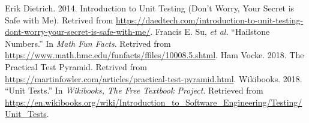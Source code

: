 \documentclass{utap}
\begin{document}
    \begin{thebibliography}{9}
    \begin{latinitems}
     Erik Dietrich. 2014. Introduction to Unit Testing (Don’t Worry, Your Secret is Safe with Me). Retrived from \url{https://daedtech.com/introduction-to-unit-testing-dont-worry-your-secret-is-safe-with-me/}.
     Francis E. Su, \textit{et al.} ``Hailstone Numbers.'' In \textit{Math Fun Facts}. Retrived from \url{https://www.math.hmc.edu/funfacts/ffiles/10008.5.shtml}.
     Ham Vocke. 2018. The Practical Test Pyramid. Retrived from \url{https://martinfowler.com/articles/practical-test-pyramid.html}.
     Wikibooks. 2018. ``Unit Tests.'' In \textit{Wikibooks, The Free Textbook Project}. Retrieved from \url{https://en.wikibooks.org/wiki/Introduction_to_Software_Engineering/Testing/Unit_Tests}.
    \end{latinitems}
    \end{thebibliography}
\end{document}
